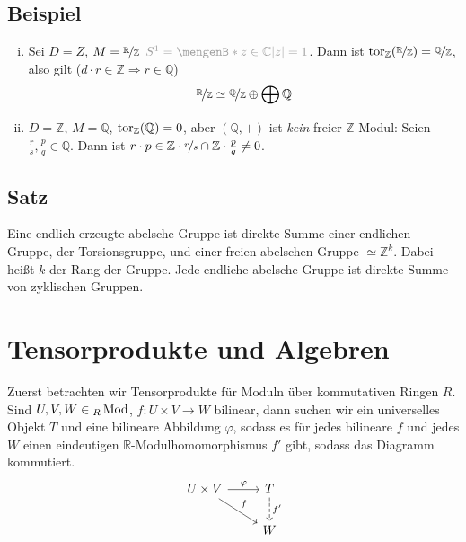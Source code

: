 \subsection[Beispiele für Zerlegungen mit dem Torsionsmodul]{Beispiel} %
\label{sub:252}
\begin{enumerate}[(i)]
	\item Sei $D=Z$, $M= \nicefrac{\mathds{R}}{\mathds{Z}} \enspace {\color{light_gray} S^1 = \set[z \in \mathds{C}]{\abs*{z}=1}}$. Dann ist 
	\(
		\tor_\mathds{Z}(\nicefrac{\mathds{R}}{\mathds{Z}}) = \nicefrac{\mathds{Q}}{\mathds{Z}}
	\), also gilt ($d \cdot r \in \mathds{Z} \Rightarrow r \in \mathds{Q}$)
	\[
		\nicefrac{\mathds{R}}{\mathds{Z}} \simeq \nicefrac{\mathds{Q}}{\mathds{Z}} \oplus \bigoplus \mathds{Q}
	\]
	\item $D=\mathds{Z}$, $M=\mathds{Q}$, $\tor_\mathds{Z}(\mathds{Q})= 0$, aber $(\mathds{Q},+)$ ist \emph{kein} freier $\mathds{Z}$-Modul: Seien 
	$\frac{r}{s}, \frac{p}{q} \in \mathds{Q}$. Dann ist $r \cdot p \in \mathds{Z} \cdot \nicefrac{r}{s} \cap \mathds{Z} \cdot \frac{p}{q} \not= 0 $.
\end{enumerate}

\subsection[Satz: Umformulierung des Struktursatzes für endl. erzeugte abelsche Gruppen]{Satz} %
\label{sub:253}
Eine endlich erzeugte abelsche Gruppe ist direkte Summe einer endlichen Gruppe, der Torsionsgruppe, und einer freien abelschen Gruppe $\simeq \mathds{Z}^k$. Dabei heißt
$k$ der Rang der Gruppe. Jede endliche abelsche Gruppe ist direkte Summe von zyklischen Gruppen.
\newpage

\section{Tensorprodukte und Algebren} %
\label{sec:3}
Zuerst betrachten wir Tensorprodukte für Moduln über kommutativen Ringen $R$. Sind $U,V, W \in {_R \Mod}$, $f : U \times V \to W$ bilinear, dann suchen wir ein 
universelles Objekt $T$ und eine bilineare Abbildung $\varphi$, sodass es für jedes bilineare $f$ und jedes $W$ einen eindeutigen $\mathds{R}$-Modulhomomorphismus $f'$ 
gibt, sodass das Diagramm kommutiert.
\[
	\begin{tikzcd}
		U \times V \rar{\varphi} \drar{f} & T \dar[dashed]{f'}\\
		& W
	\end{tikzcd}
\]

